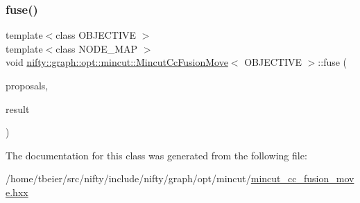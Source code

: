\mbox{\label{classnifty_1_1graph_1_1opt_1_1mincut_1_1MincutCcFusionMove_a6cf6c0686c76b97d8e93edf1b0488b7f}} 
\subsubsection{\texorpdfstring{fuse()}{fuse()}\hspace{0.1cm}{\footnotesize\ttfamily [2/2]}}
{\footnotesize\ttfamily template$<$class O\+B\+J\+E\+C\+T\+I\+VE $>$ \\
template$<$class N\+O\+D\+E\+\_\+\+M\+AP $>$ \\
void \hyperlink{classnifty_1_1graph_1_1opt_1_1mincut_1_1MincutCcFusionMove}{nifty\+::graph\+::opt\+::mincut\+::\+Mincut\+Cc\+Fusion\+Move}$<$ O\+B\+J\+E\+C\+T\+I\+VE $>$\+::fuse (\begin{DoxyParamCaption}\item[{const std\+::vector$<$ const N\+O\+D\+E\+\_\+\+M\+AP $\ast$$>$ \&}]{proposals,  }\item[{N\+O\+D\+E\+\_\+\+M\+AP $\ast$}]{result }\end{DoxyParamCaption})\hspace{0.3cm}{\ttfamily [inline]}}



The documentation for this class was generated from the following file\+:\begin{DoxyCompactItemize}
\item 
/home/tbeier/src/nifty/include/nifty/graph/opt/mincut/\hyperlink{mincut__cc__fusion__move_8hxx}{mincut\+\_\+cc\+\_\+fusion\+\_\+move.\+hxx}\end{DoxyCompactItemize}
